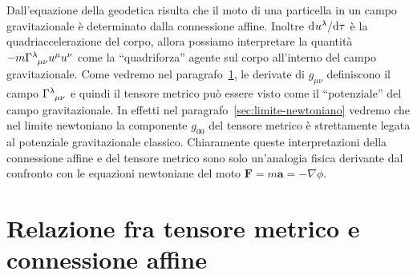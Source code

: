 Dall'equazione della geodetica risulta che il moto di una particella in un campo
gravitazionale è determinato dalla connessione affine.  Inoltre
$\mathrm{d}^{}u^{\lambda} / \mathrm{d} {\tau}^{}$ è la quadriaccelerazione del corpo, allora possiamo
interpretare la quantità
$-m\tensor{\Gamma}{^{\lambda}_{\mu\nu}} u^{\mu} u^{\nu}$ come la ``quadriforza''
agente sul corpo all'interno del campo gravitazionale.  Come vedremo nel
paragrafo~\ref{sec:relazione-g-Gamma}, le derivate di $g_{\mu\nu}$ definiscono
il campo $\tensor{\Gamma}{^{\lambda}_{\mu\nu}}$ e quindi il tensore metrico può
essere visto come il ``potenziale'' del campo gravitazionale.  In effetti nel
paragrafo~\ref{sec:limite-newtoniano} vedremo che nel limite newtoniano la
componente $g_{00}$ del tensore metrico è strettamente legata al potenziale
gravitazionale classico.  Chiaramente queste interpretazioni della connessione
affine e del tensore metrico sono solo un'analogia fisica derivante dal
confronto con le equazioni newtoniane del moto
$\bm{F} = m \bm{a} = - \nabla\phi$.

\section{Relazione fra tensore metrico e connessione affine}
\label{sec:relazione-g-Gamma}

